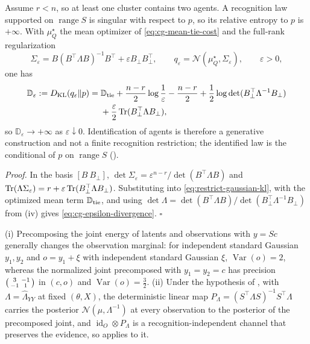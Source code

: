 Assume \(r<n\), so at least one cluster contains two agents.
A recognition law supported on \(\operatorname{range}S\) is singular with
respect to \(p\), so its relative entropy to \(p\) is \(+\infty\). With
\(\mu_Q^\star\) the mean optimizer of \eqref{eq:cg-mean-tie-cost} and the
full-rank regularization
\begin{equation}
\Sigma_\varepsilon
=B(B^\top\Lambda B)^{-1}B^\top
+\varepsilon B_\perp B_\perp^\top,
\qquad
q_\varepsilon=\mathcal N(\mu_Q^\star,\Sigma_\varepsilon),
\qquad \varepsilon>0,
\label{eq:cg-epsilon-regularized-law}
\end{equation}
one has
\begin{equation}
\begin{aligned}
\mathbb D_\varepsilon
:=D_{\mathrm{KL}}(q_\varepsilon\Vert p)
={}&\mathbb D_{\rm tie}
+\frac{n-r}{2}\log\frac1\varepsilon-\frac{n-r}2
+\frac12\log\det(B_\perp^\top\Lambda^{-1}B_\perp)\\
&+\frac{\varepsilon}{2}
\operatorname{Tr}(B_\perp^\top\Lambda B_\perp),
\end{aligned}
\label{eq:cg-epsilon-divergence}
\end{equation}
so \(\mathbb D_\varepsilon\to+\infty\) as \(\varepsilon\downarrow0\).
Identification of agents is therefore a generative construction and not a
finite recognition restriction; the identified law is the conditional of
\(p\) on \(\operatorname{range}S\) ().

\noindent\emph{Proof.}
In the basis \([B\ B_\perp]\), \(\det\Sigma_\varepsilon=\varepsilon^{n-r}/\det(B^\top\Lambda B)\)
and \(\operatorname{Tr}(\Lambda\Sigma_\varepsilon)=r+\varepsilon\operatorname{Tr}(B_\perp^\top\Lambda B_\perp)\).
Substituting into \eqref{eq:restrict-gaussian-kl}, with the optimized mean
term \(\mathbb D_{\rm tie}\), and using
\(\det\Lambda=\det(B^\top\Lambda B)/\det(B_\perp^\top\Lambda^{-1}B_\perp)\)
from (iv) gives \eqref{eq:cg-epsilon-divergence}.
\(\square\)

(i) Precomposing the joint energy of latents and observations with \(y=Sc\)
generally changes the observation marginal: for independent standard Gaussian
\(y_1,y_2\) and \(o=y_1+\xi\) with independent standard Gaussian \(\xi\),
\(\operatorname{Var}(o)=2\), whereas the normalized joint precomposed with
\(y_1=y_2=c\) has precision \(\begin{psmallmatrix}3&-1\\-1&1\end{psmallmatrix}\)
in \((c,o)\) and \(\operatorname{Var}(o)=\tfrac32\). (ii) Under the hypothesis
of , with
\(\Lambda=\widehat\Lambda_{YY}\) at fixed \((\theta,X)\), the deterministic
linear map \(P_\Lambda=(S^\top\Lambda S)^{-1}S^\top\Lambda\) carries the posterior
\(\mathcal N(\mu,\Lambda^{-1})\) at every observation to the posterior of the
precomposed joint, and \(\operatorname{id}_O\otimes P_\Lambda\) is a
recognition-independent channel that preserves the evidence, so
 applies to it. 

